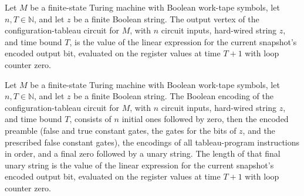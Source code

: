\begin{theorem}
\label{Complexity.UTab.cfgTab_output}
\leanok
{}
Let $M$ be a finite-state Turing machine with Boolean work-tape symbols, let
$n,T\in\mathbb{N}$, and let $z$ be a finite Boolean string. The output vertex of the
configuration-tableau circuit for $M$, with $n$ circuit inputs, hard-wired string $z$,
and time bound $T$, is the value of the linear expression for the current snapshot’s
encoded output bit, evaluated on the register values at time $T+1$ with loop counter
zero.
\end{theorem}

\begin{theorem}
\label{Complexity.UTab.cfgTab_encode}
\leanok
{}
Let $M$ be a finite-state Turing machine with Boolean work-tape symbols, let
$n,T\in\mathbb{N}$, and let $z$ be a finite Boolean string. The Boolean encoding of the
configuration-tableau circuit for $M$, with $n$ circuit inputs, hard-wired string $z$,
and time bound $T$, consists of $n$ initial ones followed by zero, then the encoded
preamble (false and true constant gates, the gates for the bits of $z$, and the
prescribed false constant gates), the encodings of all tableau-program instructions in
order, and a final zero followed by a unary string. The length of that final unary
string is the value of the linear expression for the current snapshot’s encoded output
bit, evaluated on the register values at time $T+1$ with loop counter zero.
\end{theorem}

